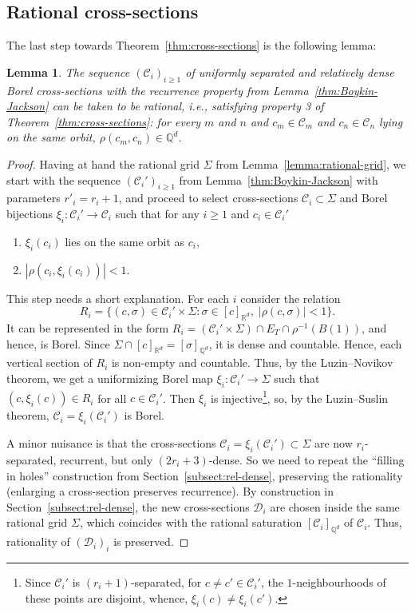 \documentclass[11pt]{paper}
\newtheorem{lemma}{Lemma}
\newcommand{\bR}{\mathbb R}
\newcommand{\bQ}{\mathbb Q}
\newcommand{\cD}{\mathcal D}
\newcommand{\cC}{\mathcal C}
\begin{document}
\subsection{Rational cross-sections}
The last step towards Theorem~\ref{thm:cross-sections}
is the following lemma:
\begin{lemma}
\label{lemma:rational}
The sequence $(\cC_i)_{i\ge 1}$ of uniformly separated and relatively dense Borel
cross-sections with the recurrence property from Lemma~\ref{thm:Boykin-Jackson}
can be taken to be rational, i.e., satisfying property 3 of Theorem~\ref{thm:cross-sections}:
for every $m$ and $n$ and $c_m\in\cC_m$ and $c_n\in\cC_n$ lying on the same orbit,
$\rho(c_m, c_n)\in\bQ^d$.
\end{lemma}

\begin{proof}
Having at hand the rational grid $\Sigma$ from Lemma~\ref{lemma:rational-grid}, we start with the
sequence $(\cC_i')_{i\ge 1}$ from Lemma~\ref{thm:Boykin-Jackson}
with parameters $r'_i=r_i+1$, and proceed to select
cross-sections $\cC_i\subset \Sigma$ and Borel
bijections $\xi_i\colon \cC_i'\to\cC_i$
such that for any $i\ge 1$ and $c_i\in\cC_i'$
\begin{enumerate}
\item $\xi_i(c_i)$ lies on the same orbit as $c_i$,
\item $|\rho(c_i, \xi_i(c_i))|<1$.
\end{enumerate}
This step needs a short explanation. For each $i$ consider the relation
\[
R_i = \{(c, \sigma)\in\cC_i' \times \Sigma\colon \sigma\in [c]_{\bR^d}, \;
|\rho(c, \sigma)| <1\}.
\]
It can be represented in the form
$ R_i = (\cC_i' \times \Sigma) \cap E_T \cap \rho^{-1}(B(1)) $,
and hence, is Borel. Since $\Sigma\cap [c]_{\bR^d} =  [\sigma]_{\bQ^d}$,
it is dense and countable. Hence, each vertical section of $R_i$ is non-empty and
countable. Thus, by the Luzin--Novikov theorem, we get a uniformizing Borel map
$\xi_i\colon \cC_i'\to \Sigma$ such that $(c, \xi_i(c))\in R_i$ for all $c\in \cC_i'$.
Then $\xi_i$ is injective\footnote{
Since $\cC_i'$ is $(r_i+1)$-separated, for $c\ne c'\in \cC_i'$, the
$1$-neighbourhoods of these points are disjoint, whence, $\xi_i(c)\ne \xi_i(c')$.},
so, by the Luzin--Suslin theorem, $\cC_i=\xi_i(\cC_i')$ is Borel.

\smallskip
A minor nuisance is that the cross-sections $\cC_i = \xi_i(\cC_i')\subset \Sigma$
are now $r_i$-separated, recurrent, but only $(2r_i+3)$-dense. So we need to repeat the
``filling in holes'' construction from Section~\ref{subsect:rel-dense}, preserving the
rationality (enlarging a cross-section preserves recurrence).
By construction in Section~\ref{subsect:rel-dense},
the new cross-sections $\cD_i$ are chosen inside the same rational grid $\Sigma$,
which coincides with the rational saturation $[\cC_i]_{\bQ^d}$ of $\cC_i$.
Thus, rationality of $(\cD_i)_i$ is preserved. \end{proof}
\end{document}
